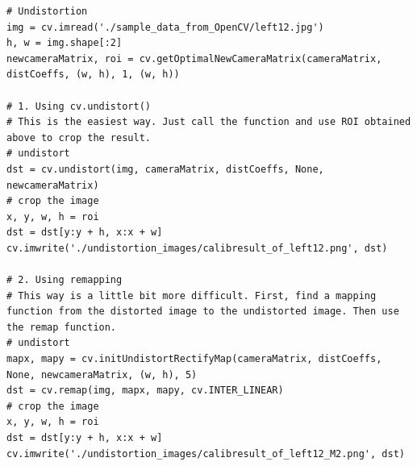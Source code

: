 \documentclass{article}
\begin{document}
\lstset{language=Python}
\lstset{frame=lines}
\lstset{basicstyle=\footnotesize}
\begin{lstlisting}
# Undistortion
img = cv.imread('./sample_data_from_OpenCV/left12.jpg')
h, w = img.shape[:2]
newcameraMatrix, roi = cv.getOptimalNewCameraMatrix(cameraMatrix, distCoeffs, (w, h), 1, (w, h))

# 1. Using cv.undistort()
# This is the easiest way. Just call the function and use ROI obtained above to crop the result.
# undistort
dst = cv.undistort(img, cameraMatrix, distCoeffs, None, newcameraMatrix)
# crop the image
x, y, w, h = roi
dst = dst[y:y + h, x:x + w]
cv.imwrite('./undistortion_images/calibresult_of_left12.png', dst)

# 2. Using remapping
# This way is a little bit more difficult. First, find a mapping function from the distorted image to the undistorted image. Then use the remap function.
# undistort
mapx, mapy = cv.initUndistortRectifyMap(cameraMatrix, distCoeffs, None, newcameraMatrix, (w, h), 5)
dst = cv.remap(img, mapx, mapy, cv.INTER_LINEAR)
# crop the image
x, y, w, h = roi
dst = dst[y:y + h, x:x + w]
cv.imwrite('./undistortion_images/calibresult_of_left12_M2.png', dst)
\end{lstlisting}
\end{document}

